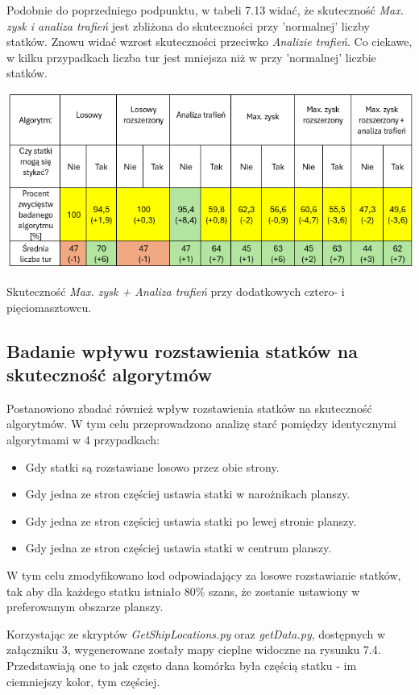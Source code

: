 Podobnie do poprzedniego podpunktu, w tabeli 7.13 widać, że skuteczność \emph{Max. zysk i analiza trafień} jest zbliżona do  skuteczności przy 'normalnej' liczby statków. Znowu widać wzrost skuteczności przeciwko \emph{Analizie trafień}. Co ciekawe, w kilku przypadkach liczba tur jest mniejsza niż w przy 'normalnej' liczbie statków.

\begin{table}[!h]
    \label{fig:vs-people}
    \centering \includegraphics[width=0.9\linewidth]{img/shipCountBigShips.png}
    \caption{Skuteczność \emph{Max. zysk + Analiza trafień} przy dodatkowych cztero- i pięciomasztowcu.}
\end{table}

\subsection{Badanie wpływu rozstawienia statków na skuteczność algorytmów}
Postanowiono zbadać również wpływ rozstawienia statków na skuteczność algorytmów. W tym celu przeprowadzono analizę starć pomiędzy identycznymi algorytmami w 4 przypadkach:

\begin{itemize}
    \item Gdy statki są rozstawiane losowo przez obie strony.
    \item Gdy jedna ze stron częściej ustawia statki w narożnikach planszy.
    \item Gdy jedna ze stron częściej ustawia statki po lewej stronie planszy.
    \item Gdy jedna ze stron częściej ustawia statki w centrum planszy.
\end{itemize}

W tym celu zmodyfikowano kod odpowiadający za losowe rozstawianie statków, tak aby dla każdego statku istniało 80\% szans, że zostanie ustawiony w preferowanym obszarze planszy.

Korzystając ze skryptów \emph{GetShipLocations.py} oraz \emph{getData.py}, dostępnych w załączniku 3, wygenerowane zostały mapy cieplne widoczne na rysunku 7.4. Przedstawiają one to jak często dana komórka była częścią statku - im ciemniejszy kolor, tym częściej.

